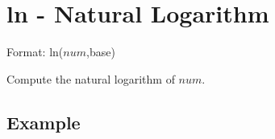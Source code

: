 
%

\section{ln - Natural Logarithm\label{sect:ln}}

Format: ln($num$,base)

Compute the natural logarithm of $num$. 


\subsection*{Example}


%

